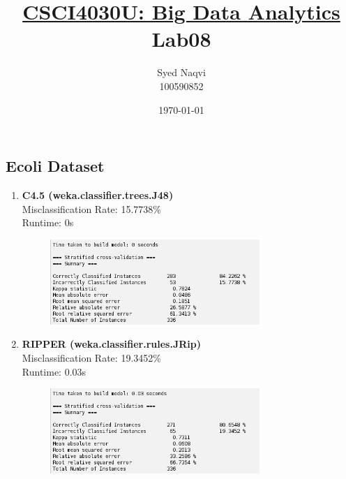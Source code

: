 \documentclass{article}
\title{\textbf{\underline{CSCI4030U: Big Data Analytics}\\Lab08}}
\author{Syed Naqvi\\100590852}
\date{\today}
\begin{document}
    \maketitle

    \subsection*{Ecoli Dataset}
    
    \begin{enumerate}[label = (\alph*), left=10pt, itemsep=10pt]
        
        \item \begin{minipage}[t]{0.9\textwidth}
            \textbf{C4.5 (weka.classifier.trees.J48)}\\
             Misclassification Rate: 15.7738\%\\
             Runtime: 0s
             \begin{figure}[H]
                \includegraphics[width=0.75\textwidth, height=0.2\textheight]{./81a.png}
            \end{figure}
        \end{minipage}
        \item \begin{minipage}[t]{0.9\textwidth}
            \textbf{RIPPER (weka.classifier.rules.JRip)}\\
             Misclassification Rate: 19.3452\%\\
             Runtime: 0.03s
             \begin{figure}[H]
                \includegraphics[width=0.75\textwidth, height=0.2\textheight]{./81b.png}
            \end{figure}

\end{minipage}
\end{enumerate}
\end{document}
